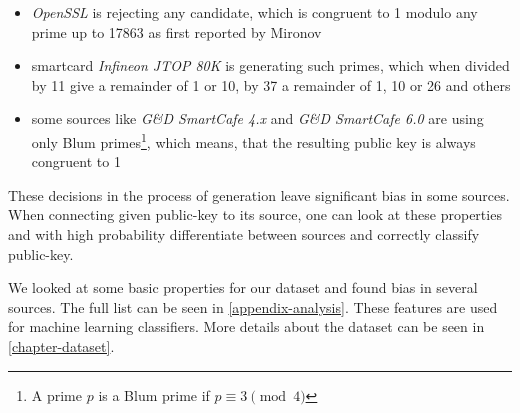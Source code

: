 \begin{itemize}

\item \textit{OpenSSL} is rejecting any candidate, which is congruent to 1 modulo any prime up to 17863 as first reported by Mironov \cite{mironov}

\item smartcard \textit{Infineon JTOP 80K} is generating such primes, which when divided by 11 give a remainder of 1 or 10, by 37 a remainder of 1, 10 or 26 and others

\item some sources like \textit{G\&D SmartCafe 4.x} and \textit{G\&D SmartCafe 6.0} are using only Blum primes\footnote{A prime $p$ is a Blum prime if $p \equiv 3 \pmod{4}$}, which means, that the resulting public key is always congruent to 1

\end{itemize}

These decisions in the process of generation leave significant bias in some sources. When connecting given public-key to its source, one can look at these properties and with high probability differentiate between sources and correctly classify public-key.

We looked at some basic properties for our dataset and found bias in several sources. The full list can be seen in \autoref{appendix-analysis}. These features are used for machine learning classifiers. More details about the dataset can be seen in \autoref{chapter-dataset}.
